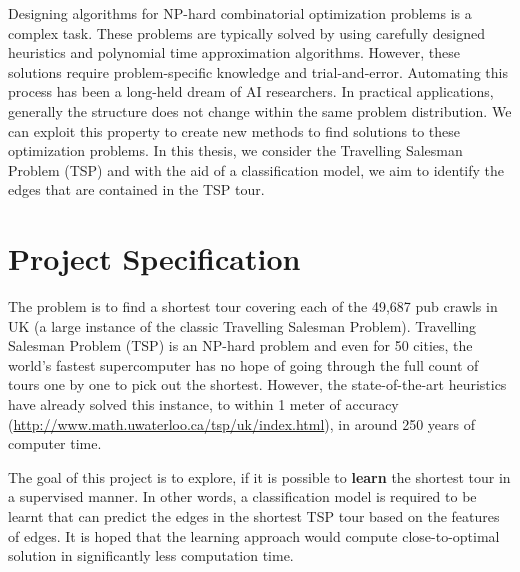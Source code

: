 \documentclass[]{UCD_CS_FYP_Report}
\begin{document}
\maketitle


\tableofcontents


\abstract
Designing algorithms for NP-hard combinatorial optimization problems is a complex task. These problems are typically solved by using carefully designed heuristics and polynomial time approximation algorithms. However, these solutions require problem-specific knowledge and trial-and-error. Automating this process has been a long-held dream of AI researchers. In practical applications, generally the structure does not change within the same problem distribution. We can exploit this property to create new methods to find solutions to these optimization problems. In this thesis, we consider the Travelling Salesman Problem (TSP) and with the aid of a classification model, we aim to identify the edges that are contained in the TSP tour. 


\chapter{Project Specification}
The problem is to find a shortest tour covering each of the 49,687 pub crawls in UK (a large instance of the classic Travelling Salesman Problem). Travelling Salesman Problem (TSP) is an NP-hard problem and even for 50 cities, the world's fastest supercomputer has no hope of going through the full count of tours one by one to pick out the shortest. However, the state-of-the-art heuristics have already solved this instance, to within 1 meter of accuracy (\url{http://www.math.uwaterloo.ca/tsp/uk/index.html}), in around 250 years of computer time.

The goal of this project is to explore, if it is possible to \textbf{learn} the shortest tour in a supervised manner. In other words, a classification model is required to be learnt that can predict the edges in the shortest TSP tour based on the features of edges. It is hoped that the learning approach would compute close-to-optimal solution in significantly less computation time.\\[0.5cm]
\end{document}
